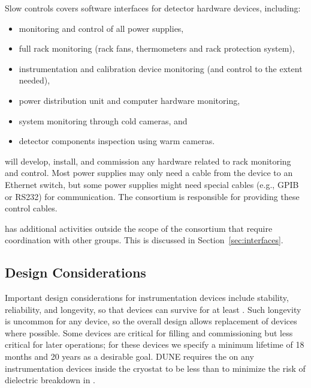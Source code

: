 Slow controls %
covers software interfaces for detector hardware devices, including:
\begin{itemize}
\item monitoring and control of all power supplies,
\item full rack monitoring (rack fans, thermometers and rack protection system),
\item instrumentation and calibration device monitoring (and control to the extent needed),
\item power distribution unit and computer hardware monitoring,
\item {} system monitoring through cold cameras, and
\item detector components inspection %
using warm cameras.
\end{itemize}
%
 will develop, install, and commission any hardware related to rack monitoring and control. Most power supplies may only need a cable from the device
to an Ethernet switch, but some power supplies might need special cables (e.g., GPIB or RS232) for communication. The  consortium is responsible for providing these control cables.

has additional activities outside the scope of the consortium that require coordination with other groups. This is discussed in Section~\ref{sec:interfaces}.

\subsection{Design Considerations}

Important design considerations for instrumentation devices include stability, reliability, and longevity, so that devices can survive for at least \dunelifetime.
Such longevity is uncommon for any device, so the overall design allows replacement of devices where possible.
Some devices are critical for filling and commissioning but less critical for later operations; for these devices we specify a minimum lifetime of 18 months and 20 years as a desirable goal.
DUNE requires the \efield  on any instrumentation devices inside the cryostat to be less than \localefield to minimize the risk of dielectric breakdown in . 

